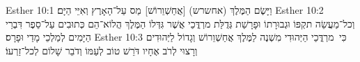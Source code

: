 Esther 10:1	וַיָּשֶׂם הַמֶּלֶךְ (אחשרש) [אֲחַשְׁוֵרוֹשׁ]  מַס עַל־הָאָרֶץ וְאִיֵּי הַיָּם׃
Esther 10:2	וְכל־מַעֲשֵׂה תקְפּוֹ וּגְבוּרָתוֹ וּפָרָשַׁת גְּדֻלַּת מרְדֳּכַי אֲשֶׁר גִּדְּלוֹ הַמֶּלֶךְ הֲלוֹא־הֵם כְּתוּבִים עַל־סֵפֶר דִּבְרֵי הַיָּמִים לְמַלְכֵי מָדַי וּפָרָס׃
Esther 10:3	כִּי  מרְדֳּכַי הַיְּהוּדִי מִשְׁנֶה לַמֶּלֶךְ אֲחַשְׁוֵרוֹשׁ וְגָדוֹל לַיְּהוּדִים וְרָצוּי לְרֹב אֶחָיו דֹּרֵשׁ טוֹב לְעַמּוֹ וְדֹבֵר שָׁלוֹם לְכל־זַרְעוֹ׃
